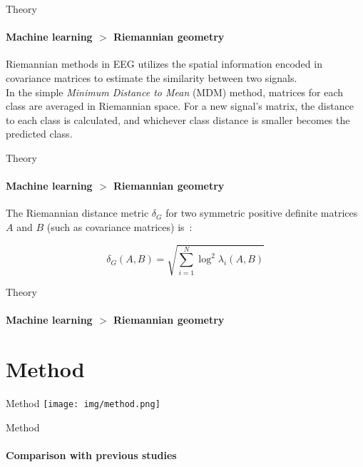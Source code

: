 \documentclass[xcolor={dvipsnames,table},12pt]{beamer}
\newif\ifplacelogo{}  %
\begin{document}
\begin{frame}{Theory}
    \framesubtitle{Machine learning $>$ Riemannian geometry}
    
    Riemannian methods in EEG utilizes the spatial information encoded in covariance matrices to estimate the similarity between two signals.
    \\
    \vspace{1em}
    In the simple \emph{Minimum Distance to Mean} (MDM) method, matrices for each class are averaged in Riemannian space. For a new signal's matrix, the distance to each class is calculated, and whichever class distance is smaller becomes the predicted class.
\end{frame}

\begin{frame}{Theory}
    \framesubtitle{Machine learning $>$ Riemannian geometry}
    
    \small The Riemannian distance metric $\delta_G$ for two symmetric positive definite matrices $A$ and $B$ (such as covariance matrices) is~\cite{grafarend_metric_2003}:

        \[ \delta_G(A, B) = \sqrt{\sum_{i=1}^N \log^2 \lambda_i (A, B) } \]
\end{frame}

\begin{frame}{Theory}
    \framesubtitle{Machine learning $>$ Riemannian geometry}
    {
        \scriptsize
        
    }
\end{frame}

\section{Method}
\begin{frame}{Method}
    \texttt{[image: img/method.png]}
\end{frame}

\placelogofalse{}
\begin{frame}{Method}
    \framesubtitle{Comparison with previous studies}
    \vspace*{-10mm}
    \begin{adjustbox}{width=\textwidth,center,float=table}
        
    \end{adjustbox}
\end{frame}
\placelogotrue{}
\end{document}
